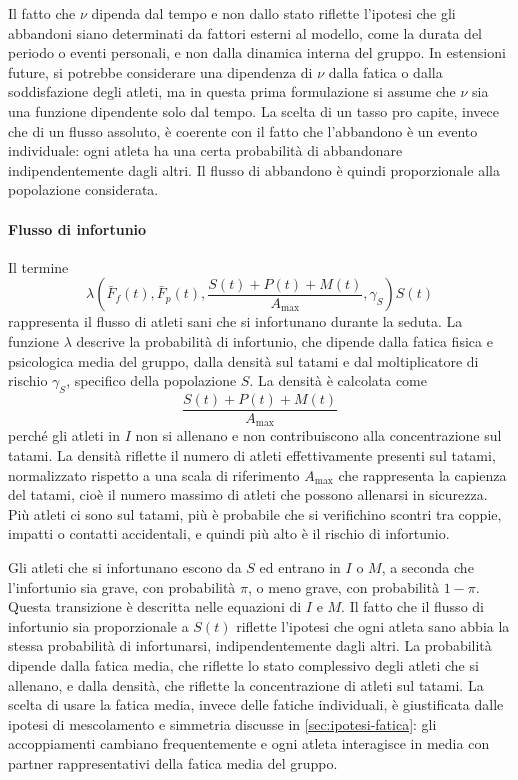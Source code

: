 Il fatto che $\nu$ dipenda dal tempo e non dallo stato riflette l'ipotesi che gli abbandoni siano determinati da fattori esterni al modello, come la durata del periodo o eventi personali, e non dalla dinamica interna del gruppo. In estensioni future, si potrebbe considerare una dipendenza di $\nu$ dalla fatica o dalla soddisfazione degli atleti, ma in questa prima formulazione si assume che $\nu$ sia una funzione dipendente solo dal tempo. La scelta di un tasso pro capite, invece che di un flusso assoluto, è coerente con il fatto che l'abbandono è un evento individuale: ogni atleta ha una certa probabilità di abbandonare indipendentemente dagli altri. Il flusso di abbandono è quindi proporzionale alla popolazione considerata.

\paragraph{Flusso di infortunio}
Il termine
\[
    \lambda\left(\bar{F}_f(t), \bar{F}_p(t), \frac{S(t) + P(t) + M(t)}{A_{\max}}, \gamma_S\right) S(t)
\]
rappresenta il flusso di atleti sani che si infortunano durante la seduta. La funzione $\lambda$ descrive la probabilità di infortunio, che dipende dalla fatica fisica e psicologica media del gruppo, dalla densità sul tatami e dal moltiplicatore di rischio $\gamma_S$, specifico della popolazione $S$. La densità è calcolata come
\[
    \frac{S(t) + P(t) + M(t)}{A_{\max}}
\]
perché gli atleti in $I$ non si allenano e non contribuiscono alla concentrazione sul tatami. La densità riflette il numero di atleti effettivamente presenti sul tatami, normalizzato rispetto a una scala di riferimento $A_{\max}$ che rappresenta la capienza del tatami, cioè il numero massimo di atleti che possono allenarsi in sicurezza. Più atleti ci sono sul tatami, più è probabile che si verifichino scontri tra coppie, impatti o contatti accidentali, e quindi più alto è il rischio di infortunio. \par

Gli atleti che si infortunano escono da $S$ ed entrano in $I$ o $M$, a seconda che l'infortunio sia grave, con probabilità $\pi$, o meno grave, con probabilità $1-\pi$. Questa transizione è descritta nelle equazioni di $I$ e $M$. Il fatto che il flusso di infortunio sia proporzionale a $S(t)$ riflette l'ipotesi che ogni atleta sano abbia la stessa probabilità di infortunarsi, indipendentemente dagli altri. La probabilità dipende dalla fatica media, che riflette lo stato complessivo degli atleti che si allenano, e dalla densità, che riflette la concentrazione di atleti sul tatami. La scelta di usare la fatica media, invece delle fatiche individuali, è giustificata dalle ipotesi di mescolamento e simmetria discusse in \autoref{sec:ipotesi-fatica}: gli accoppiamenti cambiano frequentemente e ogni atleta interagisce in media con partner rappresentativi della fatica media del gruppo.


